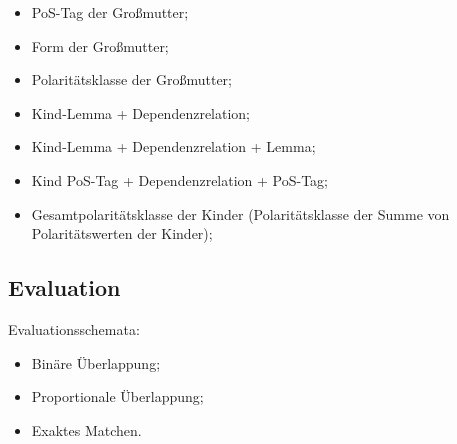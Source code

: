 \documentclass{beamer}
\begin{document}
\begin{frame}{\insertsubsection}
\begin{multicols}{2}
\begin{itemize}
\begin{itemize}
            \item PoS-Tag der Gro\ss{}mutter;
            \item Form der Gro\ss{}mutter;
            \item Polarit\"atsklasse der Gro\ss{}mutter;
            \item Kind-Lemma + Dependenzrelation;
            \item Kind-Lemma + Dependenzrelation + Lemma;
            \item Kind PoS-Tag + Dependenzrelation + PoS-Tag;
            \item Gesamtpolarit\"atsklasse der Kinder (Polarit\"atsklasse der
              Summe von Polarit\"atswerten der Kinder);
          \end{itemize}
        \end{itemize}
      \end{multicols}
    \end{frame}

    \subsection{Evaluation}
    \begin{frame}{\insertsubsection}
      Evaluationsschemata:
      \begin{itemize}
        \scriptsize
        \item Bin\"are \"Uberlappung;
        \item Proportionale \"Uberlappung;
        \item Exaktes Matchen.
      \end{itemize}
    \end{frame}
\end{document}
